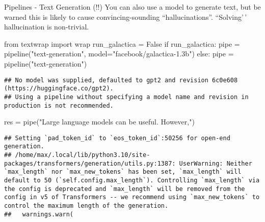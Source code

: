 \documentclass[
  10pt,
  ignorenonframetext,
  aspectratio=169]{beamer}
\newenvironment{Shaded}{\begin{snugshade}}{\end{snugshade}}
\newcommand{\ControlFlowTok}[1]{\textcolor[rgb]{0.94,0.87,0.69}{#1}}
\newcommand{\ImportTok}[1]{\textcolor[rgb]{0.80,0.80,0.80}{#1}}
\newcommand{\NormalTok}[1]{\textcolor[rgb]{0.80,0.80,0.80}{#1}}
\newcommand{\OperatorTok}[1]{\textcolor[rgb]{0.94,0.94,0.82}{#1}}
\newcommand{\StringTok}[1]{\textcolor[rgb]{0.80,0.58,0.58}{#1}}
\newcommand{\VariableTok}[1]{\textcolor[rgb]{0.80,0.80,0.80}{#1}}
\begin{document}
\begin{frame}[fragile]{Pipelines - Text Generation (!!)}
\protect\hypertarget{pipelines---text-generation}{}
You can also use a model to generate text, but be warned this is likely
to cause convincing-sounding ``hallucinations''. ``Solving'\,'
hallucination is non-trivial.

\medskip
\scriptsize

\begin{Shaded}
\begin{Highlighting}[]
\ImportTok{from}\NormalTok{ textwrap }\ImportTok{import}\NormalTok{ wrap}
\NormalTok{run\_galactica }\OperatorTok{=} \VariableTok{False}
\ControlFlowTok{if}\NormalTok{ run\_galactica:}
\NormalTok{    pipe }\OperatorTok{=}\NormalTok{ pipeline(}\StringTok{"text{-}generation"}\NormalTok{, model}\OperatorTok{=}\StringTok{"facebook/galactica{-}1.3b"}\NormalTok{)}
\ControlFlowTok{else}\NormalTok{:}
\NormalTok{    pipe }\OperatorTok{=}\NormalTok{ pipeline(}\StringTok{"text{-}generation"}\NormalTok{)}
    
\end{Highlighting}
\end{Shaded}

\begin{verbatim}
## No model was supplied, defaulted to gpt2 and revision 6c0e608 (https://huggingface.co/gpt2).
## Using a pipeline without specifying a model name and revision in production is not recommended.
\end{verbatim}

\begin{Shaded}
\begin{Highlighting}[]
\NormalTok{res }\OperatorTok{=}\NormalTok{ pipe(}\StringTok{"Large language models can be useful. However,"}\NormalTok{)}
\end{Highlighting}
\end{Shaded}

\begin{verbatim}
## Setting `pad_token_id` to `eos_token_id`:50256 for open-end generation.
## /home/max/.local/lib/python3.10/site-packages/transformers/generation/utils.py:1387: UserWarning: Neither `max_length` nor `max_new_tokens` has been set, `max_length` will default to 50 (`self.config.max_length`). Controlling `max_length` via the config is deprecated and `max_length` will be removed from the config in v5 of Transformers -- we recommend using `max_new_tokens` to control the maximum length of the generation.
##   warnings.warn(
\end{verbatim}


\end{frame}
\end{document}
